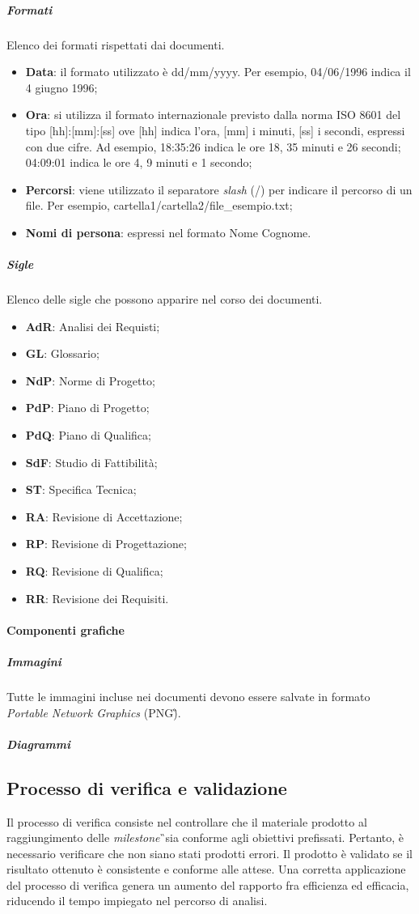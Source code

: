 \subparagraph{Formati} Elenco dei formati rispettati dai documenti.
\begin{itemize}
	\item \textbf{Data}: il formato utilizzato è dd/mm/yyyy. Per esempio, 04/06/1996 indica il 4 giugno 1996;
	\item \textbf{Ora}: si utilizza il formato internazionale previsto dalla norma ISO 8601 del tipo [hh]:[mm]:[ss] ove [hh] indica l'ora, [mm] i minuti, [ss] i secondi, espressi con due cifre. Ad esempio, 18:35:26 indica le ore 18, 35 minuti e 26 secondi; 04:09:01 indica le ore 4, 9 minuti e 1 secondo;
	\item \textbf{Percorsi}: viene utilizzato il separatore \textit{slash} (/) per indicare il percorso di un file. Per esempio, cartella1/cartella2/file\_esempio.txt;
	\item \textbf{Nomi di persona}: espressi nel formato Nome Cognome.
\end{itemize}

\subparagraph{Sigle} Elenco delle sigle che possono apparire nel corso dei documenti.
\begin{itemize}
	\item \textbf{AdR}: Analisi dei Requisti; 
	\item \textbf{GL}: Glossario; 
	\item \textbf{NdP}: Norme di Progetto; 
	\item \textbf{PdP}: Piano di Progetto;
	\item \textbf{PdQ}: Piano di Qualifica; 
	\item \textbf{SdF}: Studio di Fattibilità;
	\item \textbf{ST}: Specifica Tecnica; 
	\item \textbf{RA}: Revisione di Accettazione;
	\item \textbf{RP}: Revisione di Progettazione;
	\item \textbf{RQ}: Revisione di Qualifica;
	\item \textbf{RR}: Revisione dei Requisiti.
\end{itemize}

\paragraph{Componenti grafiche}
\subparagraph{Immagini}
Tutte le immagini incluse nei documenti devono essere salvate in formato \textit{Portable Network Graphics} (PNG\G).
\subparagraph{Diagrammi}

\subsection{Processo di verifica e validazione}
Il processo di verifica consiste nel controllare che il materiale prodotto al raggiungimento delle \textit{milestone}\G\ sia conforme agli obiettivi prefissati. Pertanto, è necessario verificare che non siano stati prodotti errori. Il prodotto è validato se il risultato ottenuto è consistente e conforme alle attese. Una corretta applicazione del processo di verifica genera un aumento del rapporto fra efficienza ed efficacia, riducendo il tempo impiegato nel percorso di analisi.
